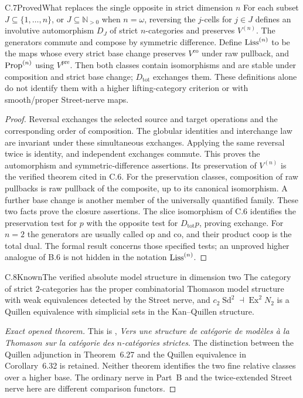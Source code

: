 \begin{claim}{C.7}{Proved}{What replaces the single opposite in strict dimension $n$}
For each subset $J\subseteq\{1,\ldots,n\}$, or $J\subseteq\mathbb N_{>0}$
when $n=\omega$, reversing the $j$-cells for $j\in J$ defines an
involutive automorphism $D_J$ of strict $n$-categories and preserves
$V^{(n)}$. The generators commute and compose by symmetric difference.
Define $\mathrm{Liss}^{(n)}$ to be the maps whose every strict base change
preserves $V^{\mathrm{co}}$ under raw pullback, and $\mathrm{Prop}^{(n)}$ using
$V^{\mathrm{pre}}$. Then both classes contain isomorphisms and are stable
under composition and strict base change; $D_{\mathrm{tot}}$ exchanges
them. These definitions alone do not identify them with a higher
lifting-category criterion or with smooth/proper Street-nerve maps.
\end{claim}
\begin{proof}
Reversal exchanges the selected source and target operations and the
corresponding order of composition. The globular identities and interchange
law are invariant under these simultaneous exchanges. Applying the same
reversal twice is identity, and independent exchanges commute. This proves
the automorphism and symmetric-difference assertions. Its preservation
of $V^{(n)}$ is the verified theorem cited in C.6.
For the preservation classes, composition of raw pullbacks is raw
pullback of the composite, up to its canonical isomorphism. A further
base change is another member of the universally quantified family.
These two facts prove the closure assertions. The slice isomorphism of
C.6 identifies the preservation test for $p$ with the opposite test for
$D_{\mathrm{tot}}p$, proving exchange. For $n=2$ the generators are
usually called $\mathrm{op}$ and $\mathrm{co}$, and their product
$\mathrm{coop}$ is the total dual. The formal result concerns those
specified tests; an unproved higher analogue of B.6 is not hidden in the
notation $\mathrm{Liss}^{(n)}$.
\end{proof}

\begin{claim}{C.8}{Known}{The verified absolute model structure in dimension two}
The category of strict $2$-categories has the proper combinatorial
Thomason model structure with weak equivalences detected by the Street
nerve, and
$c_2\operatorname{Sd}^2\dashv\operatorname{Ex}^2N_2$ is a Quillen
equivalence with simplicial sets in the Kan--Quillen structure.
\end{claim}
\begin{proof}[Exact opened theorem]
This is \citet[Theorem 6.27 and Corollary 6.32]{BCAraMaltsiniotis2014},
\emph{Vers une structure de cat\'egorie de mod\`eles \`a la Thomason
sur la cat\'egorie des $n$-cat\'egories strictes}. The distinction between
the Quillen adjunction in Theorem~6.27 and the Quillen equivalence in
Corollary~6.32 is retained. Neither theorem identifies the two fine
relative classes over a higher base. The ordinary nerve in Part~B and
the twice-extended Street nerve here are different comparison functors.
\end{proof}

